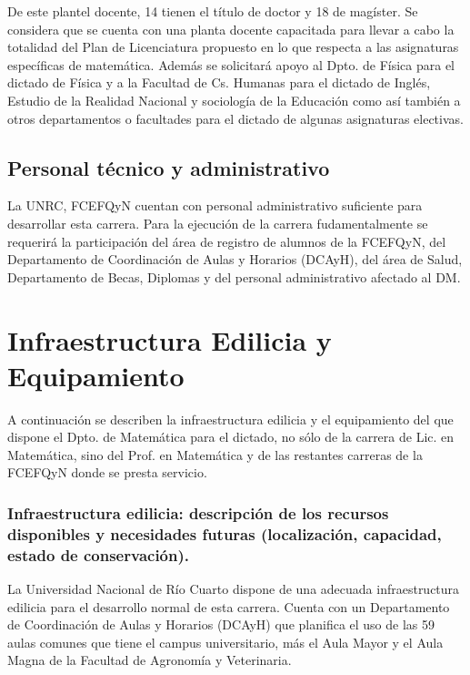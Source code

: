 \documentclass[a4paper, 12pt]{article}
\begin{document}
De este plantel docente,  14 tienen  el título de doctor y 18 de magíster. Se considera que se cuenta con una planta docente
capacitada para llevar a cabo la totalidad del Plan de
Licenciatura propuesto en lo que  respecta a las
asignaturas específicas de matemática. Además se solicitará apoyo
al Dpto. de Física para el dictado de Física y a la Facultad de
Cs. Humanas para el dictado de Inglés, Estudio de la Realidad Nacional y sociología de la Educación como así también a otros departamentos o facultades para el
dictado de algunas asignaturas electivas. 

\subsection{Personal técnico y administrativo}

La UNRC, FCEFQyN cuentan con personal
administrativo suficiente para desarrollar esta carrera. Para la ejecución de la carrera fudamentalmente   se requerirá la participación del área de registro de alumnos de la FCEFQyN, del Departamento de Coordinación de Aulas y Horarios (DCAyH), del área de Salud, Departamento de Becas, Diplomas y del personal administrativo afectado al DM.  



\section{Infraestructura Edilicia y Equipamiento}


A continuación se describen la infraestructura edilicia y el equipamiento del que dispone el Dpto. de Matemática para el dictado, no sólo  de la carrera de Lic. en Matemática, sino del Prof. en Matemática y de las restantes carreras de la FCEFQyN donde se presta servicio.   

\subsubsection{Infraestructura edilicia: descripción de los recursos disponibles y necesidades futuras (localización, capacidad, estado de conservación).} 

La Universidad Nacional de Río Cuarto dispone de una adecuada infraestructura edilicia  para el desarrollo normal de esta carrera. Cuenta con un Departamento de Coordinación de Aulas y Horarios (DCAyH) que planifica el uso de las 59 aulas comunes que tiene el campus universitario, más el Aula Mayor y el Aula Magna de la Facultad de Agronomía y Veterinaria.
\end{document}

